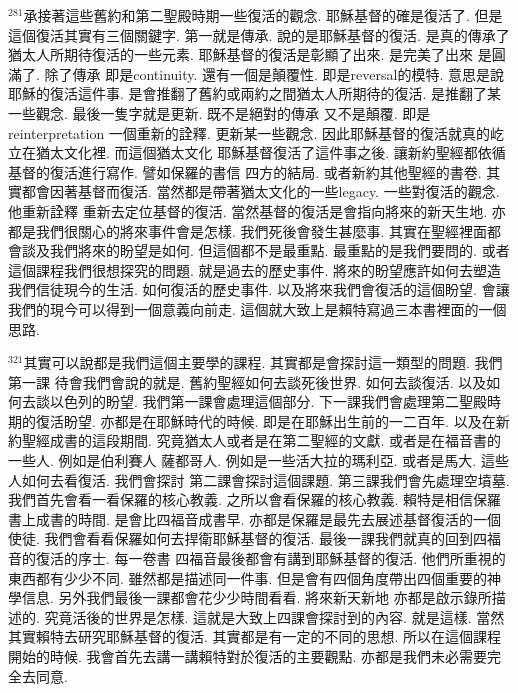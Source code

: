 \documentclass{book}
\begin{document}
$^{281}$承接著這些舊約和第二聖殿時期一些復活的觀念.
耶穌基督的確是復活了.
但是這個復活其實有三個關鍵字.
第一就是傳承.
說的是耶穌基督的復活.
是真的傳承了猶太人所期待復活的一些元素.
耶穌基督的復活是彰顯了出來.
是完美了出來 是圓滿了.
除了傳承 即是continuity.
還有一個是顛覆性.
即是reversal的模特.
意思是說耶穌的復活這件事.
是會推翻了舊約或兩約之間猶太人所期待的復活.
是推翻了某一些觀念.
最後一隻字就是更新.
既不是絕對的傳承 又不是顛覆.
即是reinterpretation 一個重新的詮釋.
更新某一些觀念.
因此耶穌基督的復活就真的屹立在猶太文化裡.
而這個猶太文化 耶穌基督復活了這件事之後.
讓新約聖經都依循基督的復活進行寫作.
譬如保羅的書信 四方的結局.
或者新約其他聖經的書卷.
其實都會因著基督而復活.
當然都是帶著猶太文化的一些legacy.
一些對復活的觀念.
他重新詮釋 重新去定位基督的復活.
當然基督的復活是會指向將來的新天生地.
亦都是我們很關心的將來事件會是怎樣.
我們死後會發生甚麼事.
其實在聖經裡面都會談及我們將來的盼望是如何.
但這個都不是最重點.
最重點的是我們要問的.
或者這個課程我們很想探究的問題.
就是過去的歷史事件.
將來的盼望應許如何去塑造我們信徒現今的生活.
如何復活的歷史事件.
以及將來我們會復活的這個盼望.
會讓我們的現今可以得到一個意義向前走.
這個就大致上是賴特寫過三本書裡面的一個思路.

$^{321}$其實可以說都是我們這個主要學的課程.
其實都是會探討這一類型的問題.
我們第一課 待會我們會說的就是.
舊約聖經如何去談死後世界.
如何去談復活.
以及如何去談以色列的盼望.
我們第一課會處理這個部分.
下一課我們會處理第二聖殿時期的復活盼望.
亦都是在耶穌時代的時候.
即是在耶穌出生前的一二百年.
以及在新約聖經成書的這段期間.
究竟猶太人或者是在第二聖經的文獻.
或者是在福音書的一些人.
例如是伯利賽人 薩都哥人.
例如是一些活大拉的瑪利亞.
或者是馬大.
這些人如何去看復活.
我們會探討 第二課會探討這個課題.
第三課我們會先處理空墳墓.
我們首先會看一看保羅的核心教義.
之所以會看保羅的核心教義.
賴特是相信保羅書上成書的時間.
是會比四福音成書早.
亦都是保羅是最先去展述基督復活的一個使徒.
我們會看看保羅如何去捍衛耶穌基督的復活.
最後一課我們就真的回到四福音的復活的序士.
每一卷書 四福音最後都會有講到耶穌基督的復活.
他們所重視的東西都有少少不同.
雖然都是描述同一件事.
但是會有四個角度帶出四個重要的神學信息.
另外我們最後一課都會花少少時間看看.
將來新天新地 亦都是啟示錄所描述的.
究竟活後的世界是怎樣.
這就是大致上四課會探討到的內容.
就是這樣.
當然其實賴特去研究耶穌基督的復活.
其實都是有一定的不同的思想.
所以在這個課程開始的時候.
我會首先去講一講賴特對於復活的主要觀點.
亦都是我們未必需要完全去同意.
\end{document}
